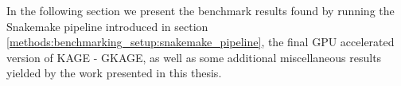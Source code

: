 In the following section we present the benchmark results found by running the Snakemake pipeline introduced in section \ref{methods:benchmarking_setup:snakemake_pipeline}, the final GPU accelerated version of KAGE - GKAGE, as well as some additional miscellaneous results yielded by the work presented in this thesis.
